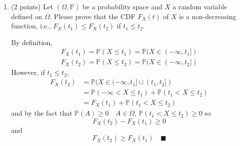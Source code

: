 \documentclass[11pt,letterpaper, leqno]{article}
\numberwithin{equation}{section}
\numberwithin{theorem}{section}
\numberwithin{lemma}{section}
\numberwithin{corollary}{section}
\numberwithin{definition}{section}
\numberwithin{proposition}{section}
\numberwithin{remark}{section}
\numberwithin{example}{section}
\renewcommand{\P}{\mathbb{P}}
\renewcommand{\qed}{\quad \blacksquare}
\begin{document}
\begin{enumerate}
\pagebreak
\item (2 points) Let $(\Omega, \mathbb{P})$ be a probability space and $X$ a random variable defined on $\Omega$. Please prove that the CDF $F_X(t)$ of $X$ is a non-decreasing function, i.e., $F_X(t_1)\le F_X(t_2)$ if $t_1\le t_2$.

\color{blue}
    By definition, 
    \begin{align*}
        F_X(t_1) = \P(X \leq t_1) = \P(X \in (-\infty, t_1])\\
        F_X(t_2) = \P(X \leq t_2) = \P(X \in (-\infty, t_2])
    \end{align*}
    However, if $t_1 \leq t_2$, 
    \begin{align*}
        F_X(t_2) &= \P(X \in (-\infty, t_1] \cup (t_1, t_2])\\
        &= \P(-\infty < X \leq t_1) + \P(t_1 < X \leq t_2)\\
        &= F_X(t_1) + \P(t_1 < X \leq t_2)
    \end{align*}
    and by the fact that $\P(A) \geq 0 \quad A \in \Omega$, $\P(t_1 < X \leq t_2) \geq 0$ so 
    \[F_X(t_2) - F_X(t_1) \geq 0\]
    and
    \[F_X(t_2) \geq F_X(t_1) \qed\]
\color{black}
\end{enumerate}
\end{document}
